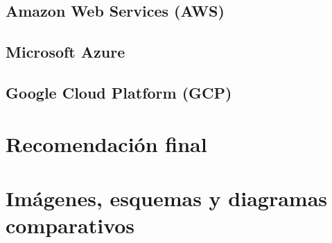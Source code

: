 \documentclass{article}
\begin{document}
  \subsection{Amazon Web Services (AWS)}
  \subsection{Microsoft Azure}
  \subsection{Google Cloud Platform (GCP)}

\section{Recomendación final}

\section{Imágenes, esquemas y diagramas comparativos}


\printbibliography
\end{document}
